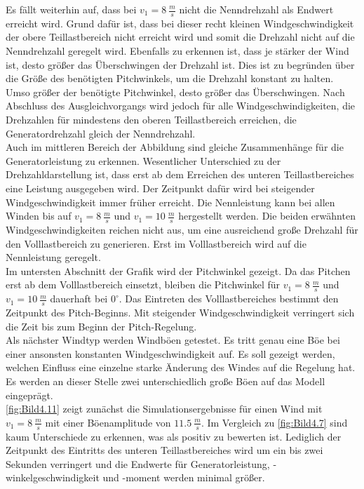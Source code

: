 Es fällt weiterhin auf, dass bei $v_1 = \SI{8}{\frac{m}{s}}$ nicht die Nenndrehzahl als Endwert erreicht wird. Grund dafür ist, dass bei dieser recht kleinen Windgeschwindigkeit der obere Teillastbereich nicht erreicht wird und somit die Drehzahl nicht auf die Nenndrehzahl geregelt wird. Ebenfalls zu erkennen ist, dass je stärker der Wind ist, desto größer das Überschwingen der Drehzahl ist. Dies ist zu begründen über die Größe des benötigten Pitchwinkels, um die Drehzahl konstant zu halten. Umso größer der benötigte Pitchwinkel, desto größer das Überschwingen. Nach Abschluss des Ausgleichvorgangs wird jedoch für alle Windgeschwindigkeiten, die Drehzahlen für mindestens den oberen Teillastbereich erreichen, die Generatordrehzahl gleich der Nenndrehzahl.\\
Auch im mittleren Bereich der Abbildung sind gleiche Zusammenhänge für die Generatorleistung zu erkennen. Wesentlicher Unterschied zu der Drehzahldarstellung ist, dass erst ab dem Erreichen des unteren Teillastbereiches eine Leistung ausgegeben wird. Der Zeitpunkt dafür wird bei steigender Windgeschwindigkeit immer früher erreicht. Die Nennleistung kann bei allen Winden bis auf $v_1 = \SI{8}{\frac{m}{s}}$ und $v_1 = \SI{10}{\frac{m}{s}}$ hergestellt werden. Die beiden erwähnten Windgeschwindigkeiten reichen nicht aus, um eine ausreichend große Drehzahl für den Volllastbereich zu generieren. Erst im Volllastbereich wird auf die Nennleistung geregelt.\\
Im untersten Abschnitt der Grafik wird der Pitchwinkel gezeigt. Da das Pitchen erst ab dem Volllastbereich einsetzt, bleiben die Pitchwinkel für $v_1 = \SI{8}{\frac{m}{s}}$ und $v_1 = \SI{10}{\frac{m}{s}}$ dauerhaft bei $0^\circ$. Das Eintreten des Volllastbereiches bestimmt den Zeitpunkt des Pitch-Beginns. Mit steigender Windgeschwindigkeit verringert sich die Zeit bis zum Beginn der Pitch-Regelung.\\


Als nächster Windtyp werden Windböen getestet. Es tritt genau eine Böe bei einer ansonsten konstanten Windgeschwindigkeit auf. Es soll gezeigt werden, welchen Einfluss eine einzelne starke Änderung des Windes auf die Regelung hat. Es werden an dieser Stelle zwei unterschiedlich große Böen auf das Modell eingeprägt.\\
\autoref{fig:Bild4.11} zeigt zunächst die Simulationsergebnisse für einen Wind mit $v_1 = \SI{8}{\frac{m}{s}}$ mit einer Böenamplitude von \ca $\SI{11.5}{\frac{m}{s}}$. Im Vergleich zu \autoref{fig:Bild4.7} sind kaum Unterschiede zu erkennen, was als positiv zu bewerten ist. Lediglich der Zeitpunkt des Eintritts des unteren Teillastbereiches wird um ein bis zwei Sekunden verringert und die Endwerte für Generatorleistung, -winkelgeschwindigkeit und -moment werden minimal größer.

